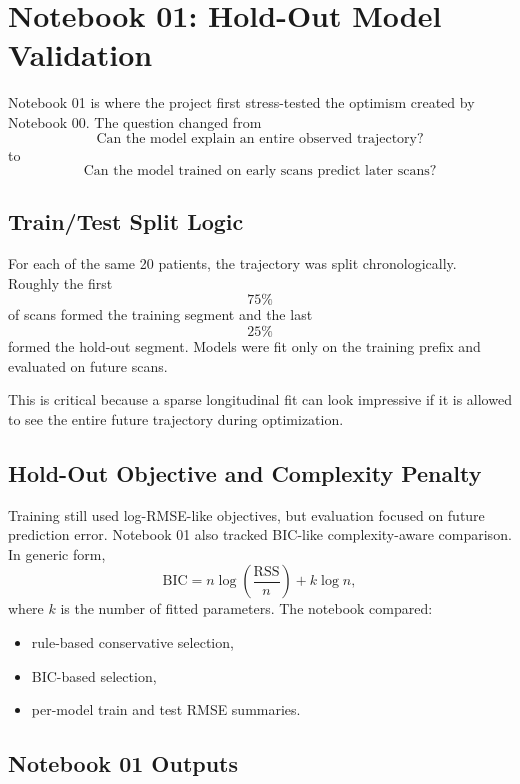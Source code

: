 \documentclass[11pt,a4paper]{article}
\begin{document}
\section{Notebook 01: Hold-Out Model Validation}

Notebook 01 is where the project first stress-tested the optimism created by Notebook 00. The question changed from
\[
    \text{Can the model explain an entire observed trajectory?}
\]
to
\[
    \text{Can the model trained on early scans predict later scans?}
\]

\subsection{Train/Test Split Logic}

For each of the same 20 patients, the trajectory was split chronologically. Roughly the first
\[
    75\%
\]
of scans formed the training segment and the last
\[
    25\%
\]
formed the hold-out segment. Models were fit only on the training prefix and evaluated on future scans.

This is critical because a sparse longitudinal fit can look impressive if it is allowed to see the entire future trajectory during optimization.

\subsection{Hold-Out Objective and Complexity Penalty}

Training still used log-RMSE-like objectives, but evaluation focused on future prediction error. Notebook 01 also tracked BIC-like complexity-aware comparison. In generic form,
\[
    \mathrm{BIC}=n\log\!\left(\frac{\mathrm{RSS}}{n}\right)+k\log n,
\]
where $k$ is the number of fitted parameters. The notebook compared:
\begin{itemize}[leftmargin=2em]
    \item rule-based conservative selection,
    \item BIC-based selection,
    \item per-model train and test RMSE summaries.
\end{itemize}

\subsection{Notebook 01 Outputs}
\end{document}
